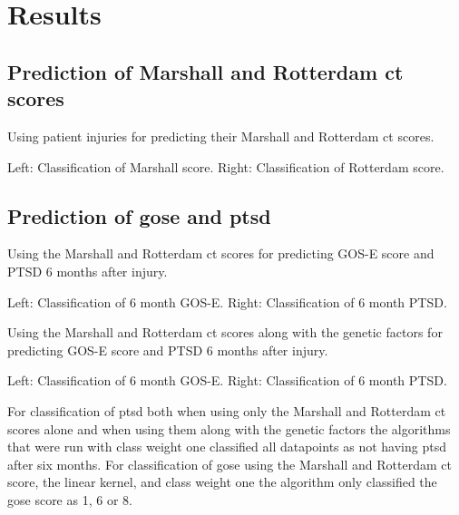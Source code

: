\documentclass[11pt]{article}
\begin{document}
\section{Results}

\subsection{Prediction of Marshall and Rotterdam \gls{ct} scores}
Using patient injuries for predicting their Marshall and Rotterdam \gls{ct} scores.\\
\begin{center}
  Left: Classification of Marshall score. Right: Classification of Rotterdam score.
   \hspace{.5cm}
\end{center}

\subsection{Prediction of \gls{gose} and \gls{ptsd}}
Using the Marshall and Rotterdam \gls{ct} scores for predicting GOS-E score and PTSD 6 months after injury.\\
\begin{center}
  Left: Classification of 6 month GOS-E. Right: Classification of 6 month PTSD.\\
   \hspace{.5cm}
\end{center}
\vspace{1cm}
Using the Marshall and Rotterdam \gls{ct} scores along with the genetic factors for predicting GOS-E score and PTSD 6 months after injury.\\
\begin{center}
  Left: Classification of 6 month GOS-E. Right: Classification of 6 month PTSD.\\
   \hspace{.5cm}
\end{center}
For classification of \gls{ptsd} both when using only the Marshall and Rotterdam \gls{ct} scores alone and when using them along with the genetic factors the algorithms that were run with class weight one classified all datapoints as not having \gls{ptsd} after six months. For classification of \gls{gose} using the Marshall and Rotterdam \gls{ct} score, the linear kernel, and class weight one the algorithm only classified the \gls{gose} score as 1, 6 or 8.
\end{document}
